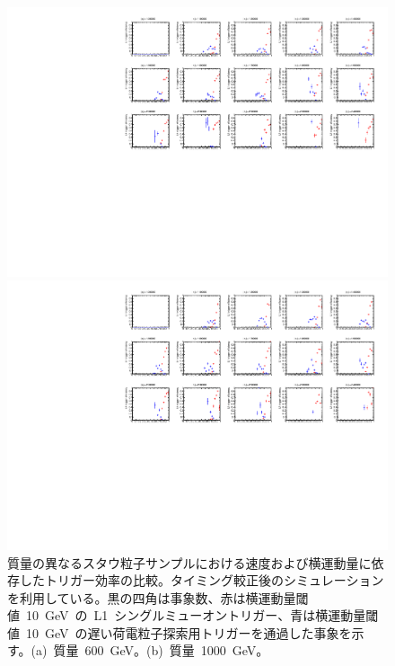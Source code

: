 \begin{figure}[H]
    \begin{minipage}{0.49\hsize}
    \centering   
    \includegraphics[width=\textwidth,page=15]{img/rec/stau_600.pdf}
    \subcaption{}
    \end{minipage}
    \begin{minipage}{0.49\hsize}
    \centering   
    \includegraphics[width=\textwidth,page=15]{img/rec/stau_1000.pdf}
    \subcaption{}
    \end{minipage}
    \caption[質量の異なるスタウ粒子サンプルにおける速度および横運動量に依存したトリガー効率の比較]{質量の異なるスタウ粒子サンプルにおける速度および横運動量に依存したトリガー効率の比較。タイミング較正後のシミュレーションを利用している。黒の四角は事象数、赤は横運動量閾値~10~GeV~の~L1~シングルミューオントリガー、青は横運動量閾値~10~GeV~の遅い荷電粒子探索用トリガーを通過した事象を示す。(a)~質量~600~GeV。(b)~質量~1000~GeV。}\label{fig:triptbeta6}
\end{figure}
